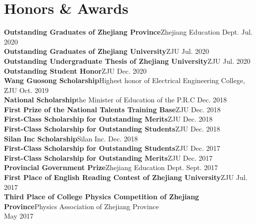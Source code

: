 \documentclass[letterpaper,11pt]{article}
\begin{document}
  \section{Honors \& Awards}
  \begin{itemize}[leftmargin=0.15in, label={}]
     \small{\item{
      \textbf{Outstanding Graduates of Zhejiang Province}{\quad Zhejiang Education Dept.} \hfill Jul. 2020\\
      \textbf{Outstanding Graduates of Zhejiang University}{\quad ZJU} \hfill  Jul. 2020\\
      \textbf{Outstanding Undergraduate Thesis of Zhejiang University}{\quad ZJU} \hfill Jul. 2020\\
      \textbf{Outstanding Student Honor}{\quad ZJU} \hfill Dec. 2020 \\
      \textbf{Wang Guosong Scholarship}{\quad Highest honor of Electrical Engineering College, ZJU} \hfill Oct. 2019 \\
      \textbf{National Scholarship}{\quad the Minister of Education of the P.R.C}  \hfill Dec. 2018\\
      \textbf{First Prize of the National Talents Training Base}{\quad ZJU} \hfill Dec. 2018\\
      \textbf{First-Class Scholarship for Outstanding Merits}{\quad ZJU} \hfill Dec. 2018\\
      \textbf{First-Class Scholarship for Outstanding Students}{\quad ZJU} \hfill Dec. 2018\\
      \textbf{Silan Inc Scholarship}{\quad Silan Inc.} \hfill Dec. 2018\\
      \textbf{First-Class Scholarship for Outstanding Students}{\quad ZJU} \hfill Dec. 2017\\
      \textbf{First-Class Scholarship for Outstanding Merits}{\quad ZJU} \hfill Dec. 2017\\
      \textbf{Provincial Government Prize}{\quad Zhejiang Education Dept.} \hfill Sept. 2017\\
      \textbf{First Place of English Reading Contest of Zhejiang University}{\quad ZJU} \hfill Jul. 2017\\
      \textbf{Third Place of College Physics Competition of Zhejiang Province}{\quad Physics Association of Zhejiang Province} \\ \hfill May 2017     }}
  \end{itemize}

\end{document}
